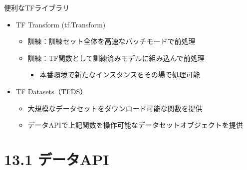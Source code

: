 \documentclass[aspectratio=169, dvipdfmx, 14pt, xcolor={svgnames,dvipsnames}, t]{beamer}
\begin{document}
\begin{frame}{便利なTFライブラリ}

  \begin{itemize}
    \tightlist
    \item
          \alert{TF Transform} (tf.Transform)

          \begin{itemize}
            \tightlist
            \item
                  訓練：訓練セット全体を高速なバッチモードで\alert{前処理}
            \item
                  訓練：TF関数として訓練済みモデルに組み込んで\alert{前処理}

                  \begin{itemize}
                    \tightlist
                    \item
                          本番環境で新たなインスタンスをその場で処理可能
                  \end{itemize}
          \end{itemize}
    \item
          \alert{TF Datasets}（TFDS）

          \begin{itemize}
            \tightlist
            \item
                  大規模なデータセットをダウンロード可能な\alert{関数}を提供
            \item
                  データAPIで上記関数を操作可能な\alert{データセットオブジェクト}を提供
          \end{itemize}
  \end{itemize}

\end{frame}


\hypertarget{ux30c7ux30fcux30bfapi}{%
  \section{13.1 データAPI}\label{ux30c7ux30fcux30bfapi}}

\end{document}
